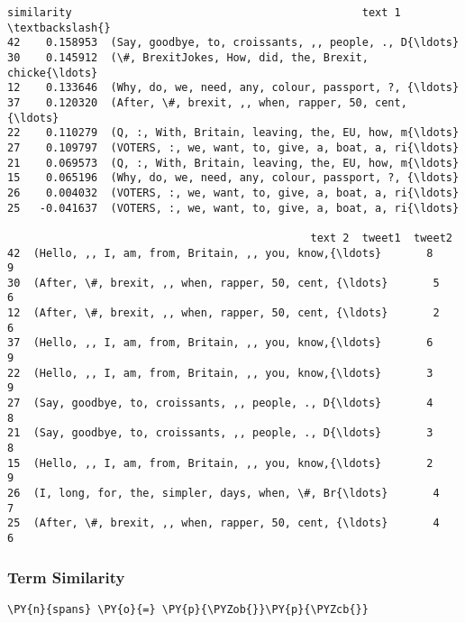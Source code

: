             \begin{tcolorbox}[breakable, size=fbox, boxrule=.5pt, pad at break*=1mm, opacityfill=0]
\begin{Verbatim}[commandchars=\\\{\}]
    similarity                                             text 1  \textbackslash{}
42    0.158953  (Say, goodbye, to, croissants, ,, people, ., D{\ldots}
30    0.145912  (\#, BrexitJokes, How, did, the, Brexit, chicke{\ldots}
12    0.133646  (Why, do, we, need, any, colour, passport, ?, {\ldots}
37    0.120320  (After, \#, brexit, ,, when, rapper, 50, cent, {\ldots}
22    0.110279  (Q, :, With, Britain, leaving, the, EU, how, m{\ldots}
27    0.109797  (VOTERS, :, we, want, to, give, a, boat, a, ri{\ldots}
21    0.069573  (Q, :, With, Britain, leaving, the, EU, how, m{\ldots}
15    0.065196  (Why, do, we, need, any, colour, passport, ?, {\ldots}
26    0.004032  (VOTERS, :, we, want, to, give, a, boat, a, ri{\ldots}
25   -0.041637  (VOTERS, :, we, want, to, give, a, boat, a, ri{\ldots}

                                               text 2  tweet1  tweet2
42  (Hello, ,, I, am, from, Britain, ,, you, know,{\ldots}       8       9
30  (After, \#, brexit, ,, when, rapper, 50, cent, {\ldots}       5       6
12  (After, \#, brexit, ,, when, rapper, 50, cent, {\ldots}       2       6
37  (Hello, ,, I, am, from, Britain, ,, you, know,{\ldots}       6       9
22  (Hello, ,, I, am, from, Britain, ,, you, know,{\ldots}       3       9
27  (Say, goodbye, to, croissants, ,, people, ., D{\ldots}       4       8
21  (Say, goodbye, to, croissants, ,, people, ., D{\ldots}       3       8
15  (Hello, ,, I, am, from, Britain, ,, you, know,{\ldots}       2       9
26  (I, long, for, the, simpler, days, when, \#, Br{\ldots}       4       7
25  (After, \#, brexit, ,, when, rapper, 50, cent, {\ldots}       4       6
\end{Verbatim}
\end{tcolorbox}
        
    \hypertarget{term-similarity}{%
\subsubsection{Term Similarity}\label{term-similarity}}

    \begin{tcolorbox}[breakable, size=fbox, boxrule=1pt, pad at break*=1mm,colback=cellbackground, colframe=cellborder]
\begin{Verbatim}[commandchars=\\\{\}]
\PY{n}{spans} \PY{o}{=} \PY{p}{\PYZob{}}\PY{p}{\PYZcb{}}
\end{Verbatim}
\end{tcolorbox}

